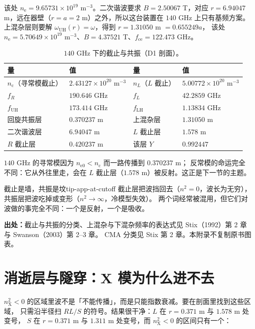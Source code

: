 该处 $n_\mathrm{e}=9.65731\times10^{19}$ m$^{-3}$。二次谐波要求 $B=2.50067$ T，对应
$r=6.94047$ m，远在器壁（$r=a=2$ m）之外，所以这台装置在 $140$ GHz 上只有基频方案。
上混杂层则要解 $\omega_\mathrm{UH}(r)=\omega$，得到 $r=1.31050$ m $=0.655249a$，
该处 $n_\mathrm{e}=5.70649\times10^{19}$ m$^{-3}$、$B=4.37521$ T、$f_\mathrm{ce}=122.473$ GHz。

\begin{table}[htbp]
\centering
\small
\caption{$140$ GHz 下的截止与共振（D1 剖面）。}
\label{tab:app-at-cutoff}
\begin{tabular}{p{4.6cm}p{3.1cm}p{4.6cm}p{3.1cm}}
\hline
量 & 值 & 量 & 值 \\
\hline
$n_\mathrm{c}$（寻常模截止） & $2.43127\times10^{20}$ m$^{-3}$ & $n_L$（$L$ 截止） & $5.00772\times10^{20}$ m$^{-3}$ \\
$f_R$ & $190.646$ GHz & $f_L$ & $42.2859$ GHz \\
$f_\mathrm{UH}$ & $173.414$ GHz & $f_\mathrm{LH}$ & $1.13834$ GHz \\
回旋共振层 & $0.370237$ m & 上混杂层 & $1.31050$ m \\
二次谐波层 & $6.94047$ m & $L$ 截止层 & $1.578$ m \\
$R$ 截止层 & $0.420237$ m & 该层 $Y$ & $0.992447$ \\
\hline
\end{tabular}
\end{table}

$140$ GHz 的寻常模因为 $n_\mathrm{e0}<n_\mathrm{c}$ 而一路传播到 $0.370237$ m；
反常模的命运完全不同：它从外往里走，会在 $L$ 截止层（$1.578$ m）被反射。这正是下一节的主题。

\begin{tip}{截止是墙，共振是坟}{tip-app-at-cutoff}
截止层把波挡回去（$n^2=0$，波长为无穷），共振层把波吃掉或变形（$n^2\to\infty$，冷模型失效）。
两个词经常被混用，但它们对波做的事完全不同：一个是反射，一个是吸收。
\end{tip}

{\footnotesize
\textbf{出处：}截止与共振的分类、上混杂与下混杂频率的表达式见 Stix（1992）第 2 章与
Swanson（2003）第 2--3 章。
CMA 分类见 Stix 第 2 章。本附录不复制原书图表。
}

\section{消逝层与隧穿：X 模为什么进不去}
\label{sec:app-at-tunneling}

$n_\mathrm{X}^2<0$ 的区域里波不是「不能传播」，而是只能指数衰减。要在剖面里找到这些区域，
只需沿半径扫 $RL/S$ 的符号。结果很干净：$L$ 在 $r=0.371$ m 与 $1.578$ m 处变号，
$S$ 在 $r=0.371$ m 与 $1.311$ m 处变号，而 $n_\mathrm{X}^2<0$ 的区间只有一个：

